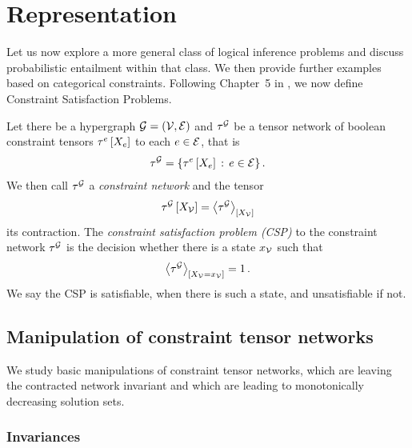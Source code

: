 \section{Representation}

Let us now explore a more general class of logical inference problems and discuss probabilistic entailment within that class.
We then provide further examples based on categorical constraints.
Following Chapter~5 in \cite{russell_artificial_2021}, we now define Constraint Satisfaction Problems.

\begin{definition}\label{def:csp}
    Let there be a hypergraph $\mathcal{G}=(\mathcal{V},\mathcal{E})$ and $\tau^{\mathcal{G}}$ be a tensor network of boolean constraint tensors $\tau^{e}\left[X_{e}\right]$ to each $e\in\mathcal{E}$, that is
    \begin{align*}
        \tau^{\mathcal{G}} = \{ \tau^{e}\left[X_{e}\right] \,:\, e\in\mathcal{E} \} \, .
    \end{align*}
    We then call $\tau^{\mathcal{G}}$ a \emph{constraint network} and the tensor
    \begin{align*} %
        \extnetat{\nodevariables}
        = \contractionof{\extnet}{\nodevariables}
    \end{align*}
    its contraction.
    The \emph{constraint satisfaction problem (CSP)} to the constraint network $\tau^{\mathcal{G}}$ is the decision whether there is a state $x_{\mathcal{V}}$ such that
    \begin{align*}
        \left\langle \tau^{\mathcal{G}}\right\rangle_{\left[ X_{\mathcal{V}}=x_{\mathcal{V}} \right]} = 1 \, .
    \end{align*}
    We say the CSP is satisfiable, when there is such a state, and unsatisfiable if not.
\end{definition}



\subsection{Manipulation of constraint tensor networks}

We study basic manipulations of constraint tensor networks, which are leaving the contracted network invariant and which are leading to monotonically decreasing solution sets.

\subsubsection{Invariances}

